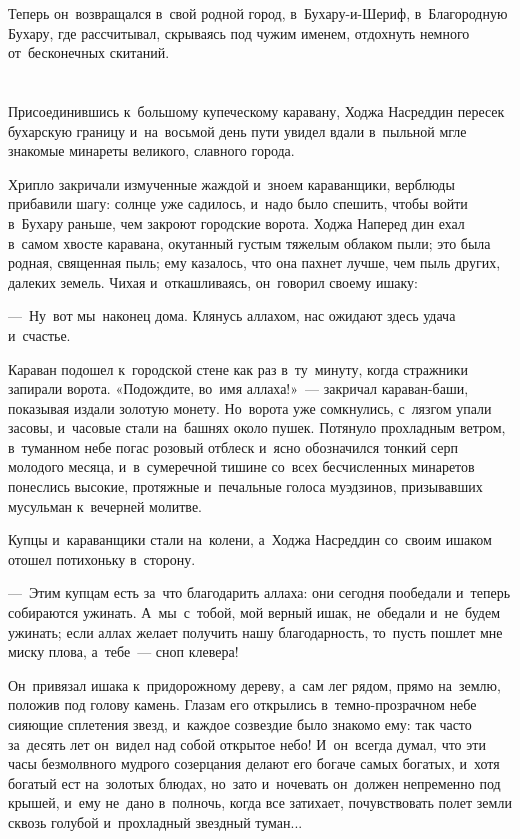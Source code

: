 \documentclass[12pt,a4paper]{book}
\begin{document}
Теперь он~возвращался в~свой родной город, в~Бухару-и-Шериф, в~Благородную Бухару, где рассчитывал, скрываясь под чужим именем, отдохнуть немного от~бесконечных скитаний.


\chapter{}

Присоединившись к~большому купеческому каравану, Ходжа Насреддин пересек бухарскую границу и~на~восьмой день пути увидел вдали в~пыльной мгле знакомые минареты великого, славного города.

Хрипло закричали измученные жаждой и~зноем караванщики, верблюды прибавили шагу: солнце уже садилось, и~надо было спешить, чтобы войти в~Бухару раньше, чем закроют городские ворота. Ходжа Наперед дин ехал в~самом хвосте каравана, окутанный густым тяжелым облаком пыли; это была родная, священная пыль; ему казалось, что она пахнет лучше, чем пыль других, далеких земель. Чихая и~откашливаясь, он~говорил своему ишаку:

—~Ну~вот мы~наконец дома. Клянусь аллахом, нас ожидают здесь удача и~счастье.

Караван подошел к~городской стене как раз в~ту~минуту, когда стражники запирали ворота. «Подождите, во~имя аллаха!»~— закричал караван-баши, показывая издали золотую монету. Но~ворота уже сомкнулись, с~лязгом упали засовы, и~часовые стали на~башнях около пушек. Потянуло прохладным ветром, в~туманном небе погас розовый отблеск и~ясно обозначился тонкий серп молодого месяца, и~в~сумеречной тишине со~всех бесчисленных минаретов понеслись высокие, протяжные и~печальные голоса муэдзинов, призывавших мусульман к~вечерней молитве.

Купцы и~караванщики стали на~колени, а~Ходжа Насреддин со~своим ишаком отошел потихоньку в~сторону.

—~Этим купцам есть за~что благодарить аллаха: они сегодня пообедали и~теперь собираются ужинать. А~мы~с~тобой, мой верный ишак, не~обедали и~не~будем ужинать; если аллах желает получить нашу благодарность, то~пусть пошлет мне миску плова, а~тебе~— сноп клевера!

Он~привязал ишака к~придорожному дереву, а~сам лег рядом, прямо на~землю, положив под голову камень. Глазам его открылись в~темно-прозрачном небе сияющие сплетения звезд, и~каждое созвездие было знакомо ему: так часто за~десять лет он~видел над собой открытое небо! И~он~всегда думал, что эти часы безмолвного мудрого созерцания делают его богаче самых богатых, и~хотя богатый ест на~золотых блюдах, но~зато и~ночевать он~должен непременно под крышей, и~ему не~дано в~полночь, когда все затихает, почувствовать полет земли сквозь голубой и~прохладный звездный туман...
\end{document}
